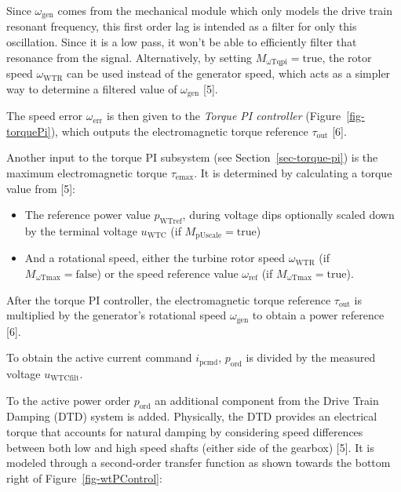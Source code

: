 \documentclass[
  a4paper,
  DIV=11,
  numbers=noendperiod]{scrartcl}
\providecommand{\tightlist}{%
  \setlength{\itemsep}{0pt}\setlength{\parskip}{0pt}}\usepackage{longtable,booktabs,array}
\begin{document}
Since \(\omega_\mathrm{gen}\) comes from the mechanical module which
only models the drive train resonant frequency, this first order lag is
intended as a filter for only this oscillation. Since it is a low pass,
it won't be able to efficiently filter that resonance from the signal.
Alternatively, by setting \(M_\mathrm{\omega Tqpi}=\mathrm{true}\), the
rotor speed \(\omega_\mathrm{WTR}\) can be used instead of the generator
speed, which acts as a simpler way to determine a filtered value of
\(\omega_\mathrm{gen}\) {[}5{]}.

The speed error \(\omega_\mathrm{err}\) is then given to the
\emph{Torque PI controller} (Figure~\ref{fig-torquePi}), which outputs
the electromagnetic torque reference \(\tau_\mathrm{out}\) {[}6{]}.

Another input to the torque PI subsystem (see
Section~\ref{sec-torque-pi}) is the maximum electromagnetic torque
\(\tau_\mathrm{emax}\). It is determined by calculating a torque value
from {[}5{]}:

\begin{itemize}
\tightlist
\item
  The reference power value \(p_\mathrm{WTref}\), during voltage dips
  optionally scaled down by the terminal voltage \(u_\mathrm{WTC}\) (if
  \(M_\mathrm{pUscale}=\mathrm{true}\))
\item
  And a rotational speed, either the turbine rotor speed
  \(\omega_\mathrm{WTR}\) (if \(M_\mathrm{\omega Tmax}=\mathrm{false}\))
  or the speed reference value \(\omega_\mathrm{ref}\) (if
  \(M_\mathrm{\omega Tmax}=\mathrm{true}\)).
\end{itemize}

After the torque PI controller, the electromagnetic torque reference
\(\tau_\mathrm{out}\) is multiplied by the generator's rotational speed
\(\omega_\mathrm{gen}\) to obtain a power reference {[}6{]}.

To obtain the active current command \(i_\mathrm{pcmd}\),
\(p_\mathrm{ord}\) is divided by the measured voltage
\(u_\mathrm{WTCfilt}\).

To the active power order \(p_\mathrm{ord}\) an additional component
from the Drive Train Damping (DTD) system is added. Physically, the DTD
provides an electrical torque that accounts for natural damping by
considering speed differences between both low and high speed shafts
(either side of the gearbox) {[}5{]}. It is modeled through a
second-order transfer function as shown towards the bottom right of
Figure~\ref{fig-wtPControl}:
\end{document}
